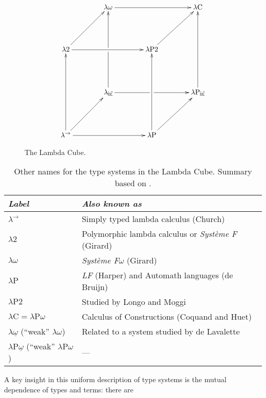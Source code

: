 \documentclass[12pt,toc=bibliography,numbers=noendperiod,
               footnotes=multiple,twoside]{scrartcl}
\begin{document}
\begin{figure}[h]
\begin{equation*}
\xymatrix@R46pt@C40pt{%
&\lambda\omega\ar@{->}[rr]&&\lambda\textrm{C} \\
\lambda\textrm{2}\ar@{->}[rr]\ar@{->}[ur]&&\lambda\textrm{P2}\ar@{->}[ur] \\
&\lambda\underline{\omega}\ar@{->}[uu]|!{"2,1";"2,3"}\hole\ar@{->}[rr]|!{"4,3";"2,3"}\hole&&\lambda\textrm{P}\underline{\omega}\ar@{->}[uu] \\
\lambda^{\rightarrow}\ar@{->}[uu]\ar@{->}[rr]\ar@{->}[ur]&&\lambda\textrm{P}\ar@{->}[uu]\ar@{->}[ur]
}
\end{equation*}
\caption{The Lambda Cube.}
\label{fig:lambda-cube}
\end{figure}

\begin{table}[h]
    \centering
    \begin{tabular}{l l}
        \toprule
        \textit{Label} & \textit{Also known as} \\
        \midrule
        \(\lambda^{\rightarrow}\) & Simply typed lambda calculus (Church) \\
        \(\lambda\textrm{2}\) & Polymorphic lambda calculus or \emph{Système F} (Girard) \\
        \(\lambda\omega\) & \emph{Système F\(\omega\)} (Girard) \\
        \(\lambda\textrm{P}\) & \emph{LF} (Harper) and Automath languages (de Bruijn) \\
        \(\lambda\textrm{P2}\) & Studied by Longo and Moggi \\
        \(\lambda\textrm{C} = \lambda\textrm{P}\omega\) & Calculus of Constructions (Coquand and Huet) \\
        \(\lambda\underline{\omega}\) (\enquote{weak} \(\lambda\omega\)) & Related to a system studied by de Lavalette \\
        \(\lambda\textrm{P}\underline{\omega}\) (\enquote{weak} \(\lambda\textrm{P}\omega\)) & --- \\
        \bottomrule
    \end{tabular}
    \caption{Other names for the type systems in the Lambda Cube. Summary based on \textcite[193]{barendregt_lambda_1992}.}
    \label{tab:lambda-cube-type-systems}
\end{table}

A key insight in this uniform description of type systems is the mutual dependence of types and terms: there are
\end{document}
